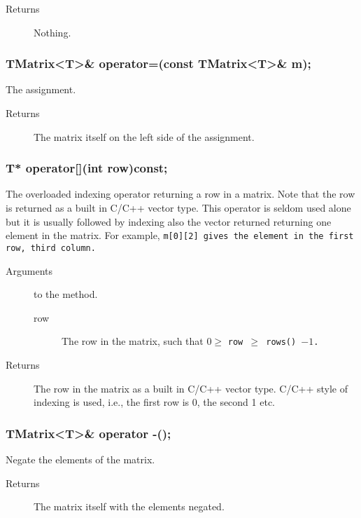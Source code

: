 \begin{description}
  \item[Returns] Nothing.
\end{description}

\subsubsection{TMatrix<T>\& operator=(const TMatrix<T>\& m);}
The assignment.

\begin{description}
  \item[Returns] The matrix itself on the left side of the assignment.
\end{description}

\subsubsection{T* operator[](int row)const;}

The overloaded indexing operator returning a row in a matrix.
Note that the row is returned as a built in C/C++ vector type.
This operator is seldom used alone but it is usually followed
by indexing also the vector returned returning one  element in the
matrix. For example, \tt m[0][2] \rm gives the element in the
first row, third column.

\begin{description}
  \item[Arguments] to the method.
    \begin{description}
      \item[row] The row in the matrix, such that 
                 $0 \geq$ \tt row $\geq$ \tt rows() \rm $- 1$.
      \end{description}
  \item[Returns] The row in the matrix as a built in C/C++ vector type.
                 C/C++ style of indexing is used, i.e., the first row is 0, 
                 the second 1 etc. 
\end{description}

\subsubsection{TMatrix<T>\& operator -();}
Negate the elements of the matrix. 
\begin{description}
   \item[Returns] The matrix itself with the elements negated.
\end{description}

